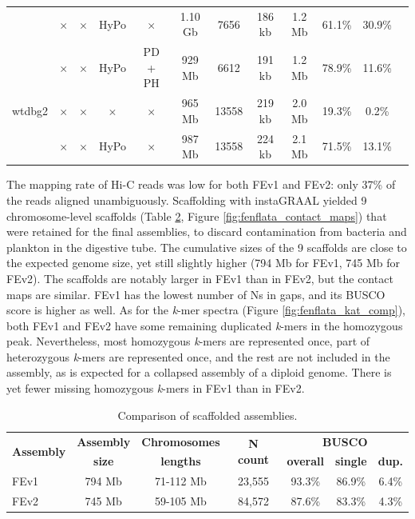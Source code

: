 \begin{table}
{\begin{tabular}{lccccccccccc}
        & $\times$ & $\times$ & HyPo & $\times$ & 1.10 Gb & 7656 & 186 kb & 1.2 Mb & 61.1\% & 30.9\% \\
        & $\times$ & $\times$ & HyPo & PD + PH & 929 Mb & 6612 & 191 kb & 1.2 Mb & 78.9\% & 11.6\% \\
    \hline
    wtdbg2 & $\times$ & $\times$ & $\times$ & $\times$ & 965 Mb & 13558 & 219 kb & 2.0 Mb & 19.3\% & 0.2\% \\
        & $\times$ & $\times$ & HyPo & $\times$ & 987 Mb & 13558 & 224 kb & 2.1 Mb & 71.5\% & 13.1\% \\
    \hline
\end{tabular}
}
\label{tab:chaeto_assemblies}
\end{table}

The mapping rate of Hi-C reads was low for both FEv1 and FEv2: only 37\% of the reads aligned unambiguously. Scaffolding with instaGRAAL yielded 9 chromosome-level scaffolds (Table \ref{tab:chaeto_scaffolded_assemblies}, Figure \ref{fig:fenflata_contact_maps}) that were retained for the final assemblies, to discard contamination from bacteria and plankton in the digestive tube. The cumulative sizes of the 9 scaffolds are close to the expected genome size, yet still slightly higher (794 Mb for FEv1, 745 Mb for FEv2). The scaffolds are notably larger in FEv1 than in FEv2, but the contact maps are similar. FEv1 has the lowest number of Ns in gaps, and its BUSCO score is higher as well. As for the \textit{k}-mer spectra (Figure \ref{fig:fenflata_kat_comp}), both FEv1 and FEv2 have some remaining duplicated \textit{k}-mers in the homozygous peak. Nevertheless, most homozygous \textit{k}-mers are represented once, part of heterozygous \textit{k}-mers are represented once, and the rest are not included in the assembly, as is expected for a collapsed assembly of a diploid genome. There is yet fewer missing homozygous \textit{k}-mers in FEv1 than in FEv2.

\begin{table}[H]
\centering
\caption{Comparison of scaffolded assemblies.}
\begin{tabular}{lcccccc}
   \hline
    \multirow{2}{*}{\textbf{Assembly}} & \textbf{Assembly} & \textbf{Chromosomes} & \multirow{2}{*}{\textbf{N count}} & \multicolumn{3}{c}{\textbf{BUSCO}} \\
        & \textbf{size} & \textbf{lengths} &  & \textbf{overall} & \textbf{single} & \textbf{dup.} \\
    \hline
    FEv1 & 794 Mb & 71-112 Mb & 23,555 & 93.3\% & 86.9\% & 6.4\% \\
    FEv2 & 745 Mb & 59-105 Mb & 84,572 & 87.6\% & 83.3\% & 4.3\% \\
    \hline
\end{tabular}
\label{tab:chaeto_scaffolded_assemblies}
\end{table}

